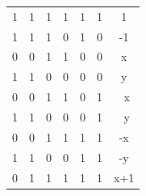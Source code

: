 \documentclass[12pt]{report}
\begin{document}
\begin{table}[H]
\begin{tabular}{|C|C|C|C|C|C|C|}
    1                                                    & 1                                                   & 1                              & 1                              & 1                                          & 1          & 1        \\
    1                                                    & 1                                                   & 1                              & 0                              & 1                                          & 0          & -1       \\
    0                                                    & 0                                                   & 1                              & 1                              & 0                                          & 0          & x        \\
    1                                                    & 1                                                   & 0                              & 0                              & 0                                          & 0          & y        \\
    0                                                    & 0                                                   & 1                              & 1                              & 0                                          & 1          & ~x       \\
    1                                                    & 1                                                   & 0                              & 0                              & 0                                          & 1          & ~y       \\
    0                                                    & 0                                                   & 1                              & 1                              & 1                                          & 1          & -x       \\
    1                                                    & 1                                                   & 0                              & 0                              & 1                                          & 1          & -y       \\
    0                                                    & 1                                                   & 1                              & 1                              & 1                                          & 1          & x+1      \\

\end{tabular}
\end{table}
\end{document}
